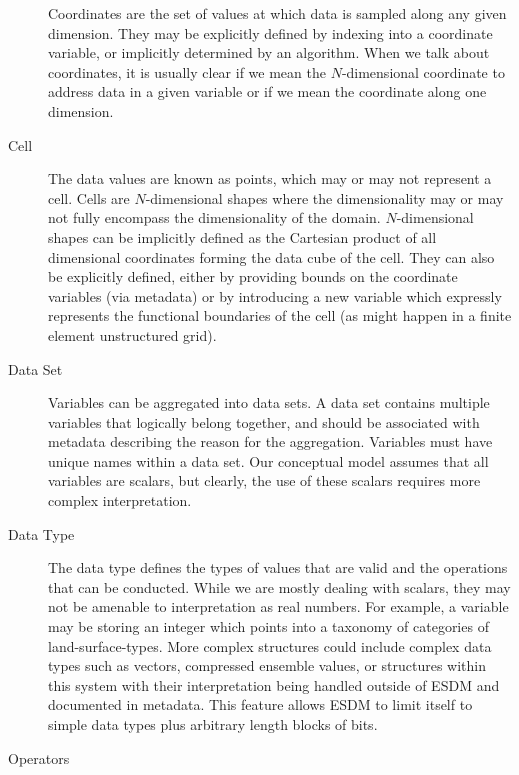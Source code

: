 \begin{description}
Coordinates are the set of values at which data is sampled along any given dimension. They may be
explicitly defined by indexing into a coordinate variable, or implicitly determined by an algorithm. When we talk about coordinates, it is usually clear if we mean the $N$-dimensional coordinate to address data in a given variable or if we mean the coordinate along one dimension.

\item[Cell]

The data values are known as points, which may or may not represent a cell. Cells are $N$-dimensional shapes where the dimensionality may or may not fully encompass the dimensionality of the domain.
$N$-dimensional shapes can be implicitly defined as the Cartesian product of all dimensional coordinates forming the data cube of the cell. They can also be explicitly defined, either by providing bounds on the coordinate variables (via metadata) or by introducing a new variable which expressly represents the functional boundaries of the cell (as might happen in a finite element unstructured grid).

\item[Data Set]

Variables can be aggregated into data sets. A data set contains multiple variables that logically belong together, and should be associated with metadata describing the reason for the aggregation.  Variables must have unique names within a data set. Our conceptual model assumes that all variables are scalars, but clearly, the use of these scalars requires more complex interpretation.

\item[Data Type]

The data type defines the types of values that are valid and the operations that can be conducted.
While we are mostly dealing with scalars, they may not be amenable to interpretation as real numbers.
For example, a variable may be storing an integer which points into a taxonomy of categories of land-surface-types.
More complex structures could include complex data types such as vectors, compressed ensemble values, or structures within this system with their interpretation being handled outside of ESDM and documented in metadata. This feature allows ESDM to limit itself to simple data types plus arbitrary length blocks of bits.

\item[Operators]


\end{description}

